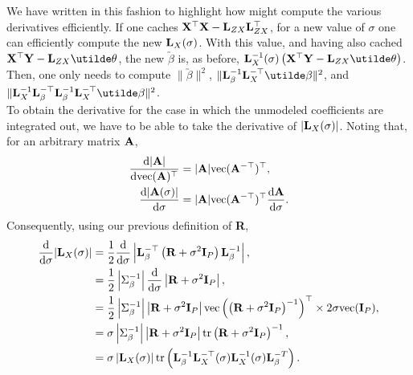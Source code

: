 \documentclass[10pt]{article}
\begin{document}
We have written in this fashion to highlight how might compute the
various derivatives efficiently. If one caches ${\bf X}^\top{\bf X} -
{\bf L}_{ZX}{\bf L}_{ZX}^\top$, for a new value of $\sigma$ one can
efficiently compute the new ${\bf L}_X(\sigma)$. With this value, and
having also cached ${\bf X}^\top{\bf Y} -
{\bf L}_{ZX}\utilde\theta$, the new $\utilde\beta$ is, as before, ${\bf L}_X^{-1}(\sigma)\left({\bf X}^\top{\bf Y} -
{\bf L}_{ZX}\utilde\theta\right)$. \\

Then, one only needs to compute $\|\utilde\beta\|^2$, $\|{\bf
  L}_\beta^{-1}{\bf L}_X^{-\top}\utilde\beta\|^2$, and $\|{\bf
  L}_X^{-1}{\bf L}_\beta^{-\top}{\bf
  L}_\beta^{-1}{\bf L}_X^{-\top}\utilde\beta\|^2$. \\

To obtain the derivative for the case in which the unmodeled
coefficients are integrated out, we have to be able to take the
derivative of $|{\bf L}_X(\sigma)|$. Noting that, for an arbitrary
matrix ${\bf A}$,
\begin{align*}
\frac{\mathrm{d}|{\bf A}|}{\mathrm{d}\mathrm{vec}({\bf A})^\top} & =
|{\bf A}|\mathrm{vec}({\bf A}^{-\top})^\top, \\
\frac{\mathrm{d}|{\bf A}(\sigma)|}{\mathrm{d}\sigma} & = |{\bf A}|\mathrm{vec}({\bf
  A}^{-\top})^\top \frac{\mathrm{d}{\bf A}}{\mathrm{d}\sigma}.
\end{align*}
Consequently, using our previous definition of {\bf R},
\begin{align*}
\frac{\mathrm{d}}{\mathrm{d}\sigma}|{\bf L}_X(\sigma)| & = \frac{1}{2}
\frac{\mathrm{d}}{\mathrm{d}\sigma}\left|{\bf
    L}_\beta^{-\top}\left({\bf R}+\sigma^2{\bf I}_P\right){\bf
    L}_\beta^{-1}\right|, \\
& = \frac{1}{2} \left|\Sigma_\beta^{-1}\right|\frac{\mathrm{d}}{\mathrm{d}\sigma} 
\left|{\bf R}+\sigma^2{\bf I}_P\right|, \\
& = \frac{1}{2} \left|\Sigma_\beta^{-1}\right|\left|{\bf R}+\sigma^2{\bf
    I}_P\right| \mathrm{vec}\left(\left({\bf R}+\sigma^2{\bf
    I}_P\right)^{-1}\right)^{\top} \times 2\sigma\mathrm{vec}({\bf
I}_P), \\
& = \sigma \left|\Sigma_\beta^{-1}\right|\left|{\bf R}+\sigma^2{\bf
    I}_P\right| \mathrm{tr}\left({\bf R}+\sigma^2{\bf
    I}_P\right)^{-1}, \\
& = \sigma\left|{\bf L}_X(\sigma)\right|\mathrm{tr}\left({\bf
    L}_\beta^{-1}{\bf L}_X^{-\top}(\sigma){\bf L}_X^{-1}(\sigma){\bf L}_\beta^{-T}\right).
\end{align*}
\end{document}
